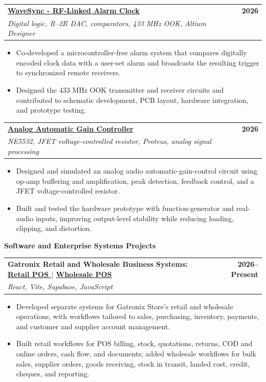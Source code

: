 \documentclass[a4paper,10pt]{article}
\makeatletter
\newcommand{\projectEntry}[3]{%
  \Needspace{9\baselineskip}%
  \begin{tabularx}{\textwidth}{@{}Xr@{}}
    \textbf{#1} & \textbf{\small #3} \\
    {\small\textit{#2}} &
  \end{tabularx}
  \vspace{0.35mm}
}
\newcommand{\projectCategory}[1]{%
  \vspace{1.0mm}
  {\normalsize\bfseries\color{accent} #1}\par
  \vspace{0.75mm}
}
\makeatother
\begin{document}
\projectEntry
  {\href{https://github.com/hakammra/wavesync-rf-alarm}  {WaveSync - RF-Linked Alarm Clock \faGithub}}
  {Digital logic, R--2R DAC, comparators, 433 MHz OOK, Altium Designer}
  {2026}
\begin{itemize}
  \item Co-developed a microcontroller-free alarm system that compares digitally encoded clock data with a user-set alarm and broadcasts the resulting trigger to synchronized remote receivers.
  \item Designed the 433 MHz OOK transmitter and receiver circuits and contributed to schematic development, PCB layout, hardware integration, and prototype testing.
\end{itemize}
\vspace{1.35mm}

\projectEntry
  {\href{https://github.com/hakammra/automatic-gain-controller}{Analog Automatic Gain Controller \faGithub}}
  {NE5532, JFET voltage-controlled resistor, Proteus, analog signal processing}
  {2026}
\begin{itemize}
  \item Designed and simulated an analog audio automatic-gain-control circuit using op-amp buffering and amplification, peak detection, feedback control, and a JFET voltage-controlled resistor.
  \item Built and tested the hardware prototype with function-generator and real-audio inputs, improving output-level stability while reducing loading, clipping, and distortion.
\end{itemize}
\vspace{1.5mm}

\projectCategory{Software and Enterprise Systems Projects}

\projectEntry
  {Gatronix Retail and Wholesale Business Systems:
  \href{https://github.com/hakammra/Shop-POS}{Retail POS \faGithub}
  \enspace $\vert$ \enspace
  \href{https://github.com/hakammra/gs-wholesale}{Wholesale POS \faGithub}}
  {React, Vite, Supabase, JavaScript}
  {2026--Present}
\begin{itemize}
  \item Developed separate systems for Gatronix Store's retail and wholesale operations, with workflows tailored to sales, purchasing, inventory, payments, and customer and supplier account management.
  \item Built retail workflows for POS billing, stock, quotations, returns, COD and online orders, cash flow, and documents; added wholesale workflows for bulk sales, supplier orders, goods receiving, stock in transit, landed cost, credit, cheques, and reporting.
\end{itemize}
\vspace{1.35mm}
\end{document}
